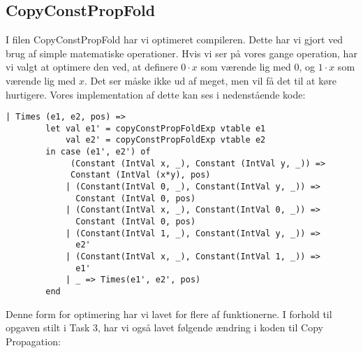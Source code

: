 \documentclass[a4paper]{article}
\begin{document}
\subsection{CopyConstPropFold}
I filen CopyConstPropFold har vi optimeret compileren. Dette har vi gjort ved brug af simple matematiske operationer. Hvis vi ser på vores gange operation, har vi valgt at optimere den ved, at definere $0 \cdot x$ som værende lig med $0$, og $1 \cdot x$ som værende lig med $x$. Det ser måske ikke ud af meget, men vil få det til at køre hurtigere. Vores implementation af dette kan ses i nedenstående kode:
\begin{lstlisting}
| Times (e1, e2, pos) =>
        let val e1' = copyConstPropFoldExp vtable e1
            val e2' = copyConstPropFoldExp vtable e2
        in case (e1', e2') of
             (Constant (IntVal x, _), Constant (IntVal y, _)) =>
             Constant (IntVal (x*y), pos)
            | (Constant(IntVal 0, _), Constant(IntVal y, _)) =>
              Constant (IntVal 0, pos)
            | (Constant(IntVal x, _), Constant(IntVal 0, _)) =>
              Constant (IntVal 0, pos)
            | (Constant(IntVal 1, _), Constant(IntVal y, _)) =>
              e2'
            | (Constant(IntVal x, _), Constant(IntVal 1, _)) =>
              e1'
            | _ => Times(e1', e2', pos)
        end
\end{lstlisting}
Denne form for optimering har vi lavet for flere af funktionerne. I forhold til opgaven stilt i Task 3, har vi også lavet følgende ændring i koden til Copy Propagation:
\end{document}
